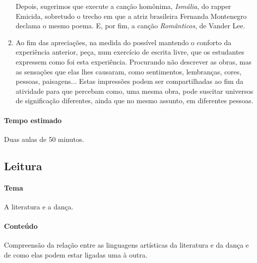 \documentclass[12pt]{extarticle}
\begin{document}
\begin{enumerate}
  Depois, sugerimos que execute a canção homônima, \textit{Ismália}, do rapper Emicida,
  sobretudo o trecho em que a atriz brasileira Fernanda Montenegro declama
  o mesmo poema. E, por fim, a canção \textit{Românticos}, de Vander Lee.

  \item
  Ao fim das apreciações, na medida do possível mantendo o conforto
  da experiência anterior, peça, num exercício de escrita livre,
  que os estudantes expressem como foi esta experiência. Procurando
  não descrever as obras, mas as sensações que elas lhes causaram, 
  como sentimentos, lembranças, cores, pessoas, paisagens... 
  Estas impressões podem ser compartilhadas ao fim da atividade para 
  que percebam como, uma mesma obra, pode suscitar universos de
  significação diferentes, ainda que no mesmo assunto, em diferentes
  pessoas.

\end{enumerate}

\paragraph{Tempo estimado} Duas aulas de 50 minutos.


\subsection{Leitura}

\paragraph{Tema} A literatura e a dança.

\paragraph{Conteúdo} Compreensão da relação entre as linguagens artísticas
da literatura e da dança e de como elas podem estar ligadas uma à outra. 
\end{document}
